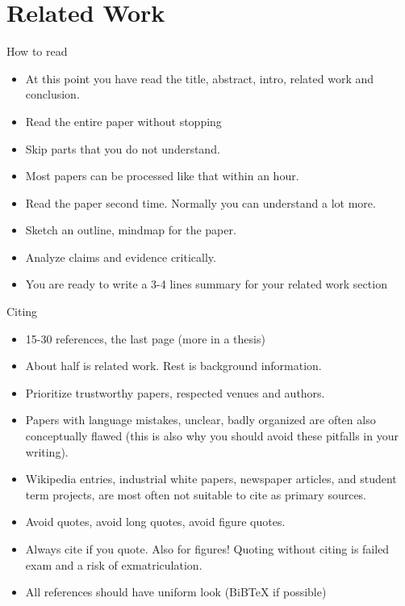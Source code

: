 \section{Related Work}
How to read
\begin{itemize}
\item At this point you have read the title, abstract, intro, related work and conclusion.
\item Read the entire paper without stopping
\item Skip parts that you do not understand.
\item Most papers can be processed like that within an hour.
\item Read the paper second time. Normally you can understand a lot more.
\item Sketch an outline, mindmap for the paper.
\item Analyze claims and evidence critically.
\item You are ready to write a 3-4 lines summary for your related work section
\end{itemize}

Citing
\begin{itemize}
\item 15-30 references, the last page (more in a thesis)
\item About half is related work. Rest is background information.
\item Prioritize trustworthy papers, respected venues and authors.
\item Papers with language mistakes, unclear, badly organized are often also conceptually flawed (this is also why you should avoid these pitfalls in your writing).
\item Wikipedia entries, industrial white papers, newspaper articles, and student term projects, are most often not suitable to cite as primary sources.
\item Avoid quotes, avoid long quotes, avoid figure quotes.
\item Always cite if you quote. Also for figures! Quoting without citing is failed exam and a risk of exmatriculation.
\item All references should have uniform look (BiBTeX if possible)
\end{itemize}

